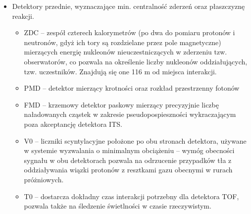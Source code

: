 \begin{itemize}
	\item Detektory przednie, wyznaczające min. centralność zderzeń oraz płaszczyznę reakcji.
	\begin{itemize}
		\item ZDC -- zespół czterech kalorymetrów (po dwa do pomiaru protonów i neutronów, gdyż ich tory są rozdzielane przez pole magnetyczne) mierzących energię nukleonów nieuczestniczących w zderzeniu tzw. obserwatorów, co pozwala na określenie liczby nukleonów oddziałujących, tzw. uczestników. Znajdują się one 116 m od miejsca interakcji.
		\item PMD -- detektor mierzący krotności oraz rozkład przestrzenny fotonów
		\item FMD -- krzemowy detektor paskowy mierzący precyzyjnie liczbę naładowanych cząstek w zakresie pseudopospieszności wykraczającym poza akceptancję detektora ITS.
		\item V0 -- liczniki scyntylacyjne położone po obu stronach detektora, używane w systemie wyzwalania o minimalnym obciążeniu  -- wymóg obecności sygnału w obu detektorach pozwala na odrzucenie przypadków tła z oddziaływania wiązki protonów z resztkami gazu obecnymi w rurach próżniowych.
		\item T0 -- dostarcza dokładny czas interakcji potrzebny dla detektora TOF, pozwala także na śledzenie świetlności w czasie rzeczywistym.
	\end{itemize}
\end{itemize}






